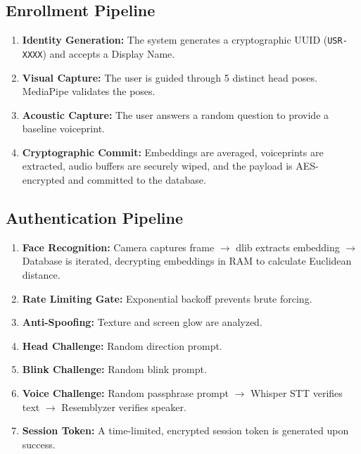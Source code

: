 \documentclass[12pt,a4paper]{article}
\begin{document}
\subsection{Enrollment Pipeline}
\begin{enumerate}
    \item \textbf{Identity Generation:} The system generates a cryptographic UUID (\texttt{USR-XXXX}) and accepts a Display Name.
    \item \textbf{Visual Capture:} The user is guided through 5 distinct head poses. MediaPipe validates the poses.
    \item \textbf{Acoustic Capture:} The user answers a random question to provide a baseline voiceprint.
    \item \textbf{Cryptographic Commit:} Embeddings are averaged, voiceprints are extracted, audio buffers are securely wiped, and the payload is AES-encrypted and committed to the database.
\end{enumerate}

\subsection{Authentication Pipeline}
\begin{enumerate}
    \item \textbf{Face Recognition:} Camera captures frame $\rightarrow$ dlib extracts embedding $\rightarrow$ Database is iterated, decrypting embeddings in RAM to calculate Euclidean distance.
    \item \textbf{Rate Limiting Gate:} Exponential backoff prevents brute forcing.
    \item \textbf{Anti-Spoofing:} Texture and screen glow are analyzed.
    \item \textbf{Head Challenge:} Random direction prompt.
    \item \textbf{Blink Challenge:} Random blink prompt.
    \item \textbf{Voice Challenge:} Random passphrase prompt $\rightarrow$ Whisper STT verifies text $\rightarrow$ Resemblyzer verifies speaker.
    \item \textbf{Session Token:} A time-limited, encrypted session token is generated upon success.
\end{enumerate}
\end{document}
